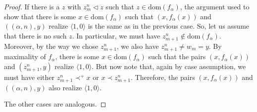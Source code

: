 \documentclass[10pt,a4paper]{amsart}
\begin{document}
\begin{proof}
If there is a $z$ with $z_m^n \lhd z$ such that $z \in \mathrm{dom}(f_\alpha)$, the argument used to show that there is some $x \in \mathrm{dom}(f_\alpha)$ such that  $(x, f_\alpha(x))$ and $((\alpha, n), y)$ realize $\langle 1,0\rangle$ is the same as in the previous case. So, let us assume that there is no such $z$. In particular, we must have $z_{m+1}^n \not\in \mathrm{dom}(f_\alpha)$. Moreover, by the way we chose $z_{m+1}^n$, we also have $z_{m+1}^n \neq w_m = y$. By maximality of $f_\alpha$, there is some $x \in \mathrm{dom}(f_\alpha)$ such that the pairs $(x, f_\alpha(x))$ and $(z_{m+1}^n, y)$ realize $\langle 1,0\rangle$. But now note that, again by case assumption, we must have either $z_{m+1}^n \prec^+ x$ or $x \prec z_{m+1}^n$. Therefore, the pairs $(x, f_\alpha(x))$ and $((\alpha, n), y)$ also realize $\langle 1,0\rangle$.

The other cases are analogous.
\end{proof}
\end{document}
